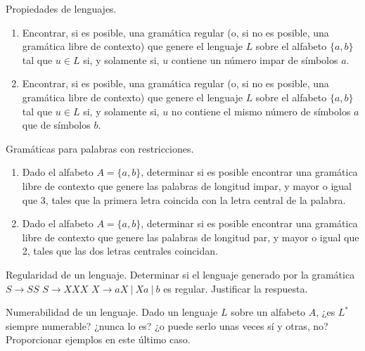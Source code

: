 \documentclass[12pt]{report} %
\begin{document}
\begin{ejercicio}
Propiedades de lenguajes.

\begin{enumerate}[label=\alph*)]
    \item Encontrar, si es posible, una gramática regular (o, si no es posible, una gramática libre de contexto) que genere el lenguaje $L$ sobre el alfabeto $\{a, b\}$ tal que $u \in L$ si, y solamente si, $u$ contiene un número impar de símbolos $a$.

    \item Encontrar, si es posible, una gramática regular (o, si no es posible, una gramática libre de contexto) que genere el lenguaje $L$ sobre el alfabeto $\{a, b\}$ tal que $u \in L$ si, y solamente si, $u$ no contiene el mismo número de símbolos $a$ que de símbolos $b$.
\end{enumerate}

\end{ejercicio}

\begin{ejercicio}
Gramáticas para palabras con restricciones.

\begin{enumerate}[label=\alph*)]
    \item Dado el alfabeto $A = \{a, b\}$, determinar si es posible encontrar una gramática libre de contexto que genere las palabras de longitud impar, y mayor o igual que 3, tales que la primera letra coincida con la letra central de la palabra.

    \item Dado el alfabeto $A = \{a, b\}$, determinar si es posible encontrar una gramática libre de contexto que genere las palabras de longitud par, y mayor o igual que 2, tales que las dos letras centrales coincidan.
\end{enumerate}

\end{ejercicio}

\begin{ejercicio}
Regularidad de un lenguaje.
Determinar si el lenguaje generado por la gramática  
$S \to SS$  
$S \to XXX$  
$X \to aX \ | \ Xa \ | \ b$  
es regular. Justificar la respuesta.
\end{ejercicio}

\begin{ejercicio}
Numerabilidad de un lenguaje.
Dado un lenguaje $L$ sobre un alfabeto $A$, ¿es $L^*$ siempre numerable? ¿nunca lo es? ¿o puede serlo unas veces sí y otras, no? Proporcionar ejemplos en este último caso.
\end{ejercicio}
\end{document}
